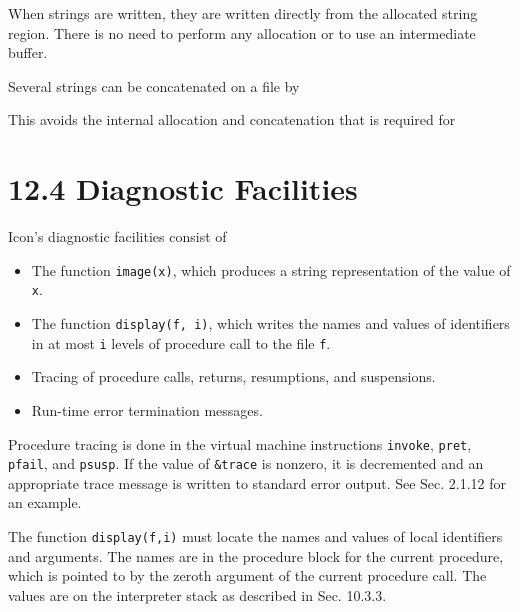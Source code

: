 When strings are written, they are written directly from the allocated
string region. There is no need to perform any allocation or to use an
intermediate buffer.

Several strings can be concatenated on a file by


This avoids the internal allocation and concatenation that is required for


\section[12.4 Diagnostic Facilities]{12.4 Diagnostic Facilities}

Icon's diagnostic facilities consist of

\liststyleLxvii
\begin{itemize}

\item The function \texttt{image(x)}, which produces a string
representation of the value of \texttt{x}.

\item The function \texttt{display(f, i)}, which writes the names and
values of identifiers in at most \texttt{i} levels of procedure call
to the file \texttt{f}.

\item Tracing of procedure calls, returns, resumptions, and suspensions.

\item Run-time error termination messages.

\end{itemize}

Procedure tracing is done in the virtual machine instructions \texttt{invoke},
\texttt{pret}, \texttt{pfail}, and \texttt{psusp}. If the value of \texttt{\&trace} is nonzero,
it is decremented and an appropriate trace message is written to
standard error output.  See Sec. 2.1.12 for an example.

The function \texttt{display(f,i)} must locate the names and values of
local identifiers and arguments. The names are in the procedure block
for the current procedure, which is pointed to by the zeroth argument
of the current procedure call. The values are on the interpreter stack
as described in Sec. 10.3.3.

